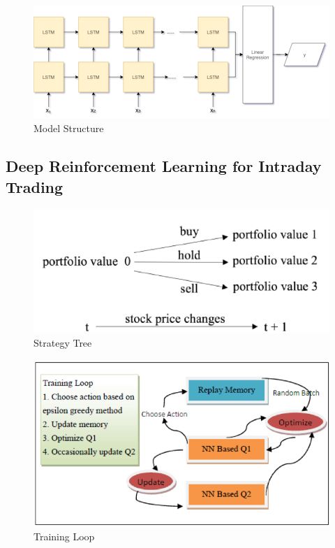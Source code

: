 \documentclass{article}
\begin{document}
\begin{figure}
  \includegraphics[width=\linewidth]{lstm.png}
  \caption{Model Structure}
  \label{fig:lstm}
\end{figure}

\subsection{Deep Reinforcement Learning for Intraday Trading}

\begin{figure}
  \includegraphics[width=\linewidth]{rl_strat.png}
  \caption{Strategy Tree}
  \label{fig:rl_strat}
\end{figure}

\begin{figure}
  \includegraphics[width=\linewidth]{rl_loop.png}
  \caption{Training Loop}
  \label{fig:rl_loop}
\end{figure}
\end{document}
